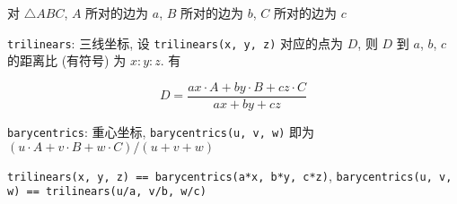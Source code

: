对 \(\triangle ABC\), \(A\) 所对的边为 \(a\), \(B\) 所对的边为 \(b\), \(C\) 所对的边为 \(c\)

\verb|trilinears|: 三线坐标, 设 \verb|trilinears(x, y, z)| 对应的点为 \(D\), 则 \(D\) 到 \(a\), \(b\), \(c\) 的距离比 (有符号) 为 \(x:y:z\). 有

\[
    D=\frac{ax\cdot A+by\cdot B+cz\cdot C}{ax+by+cz}
\]

\verb|barycentrics|: 重心坐标, \verb|barycentrics(u, v, w)| 即为 \((u\cdot A+v\cdot B+w\cdot C)/(u+v+w)\)

\verb|trilinears(x, y, z) == barycentrics(a*x, b*y, c*z)|, \verb|barycentrics(u, v, w) == trilinears(u/a, v/b, w/c)|
